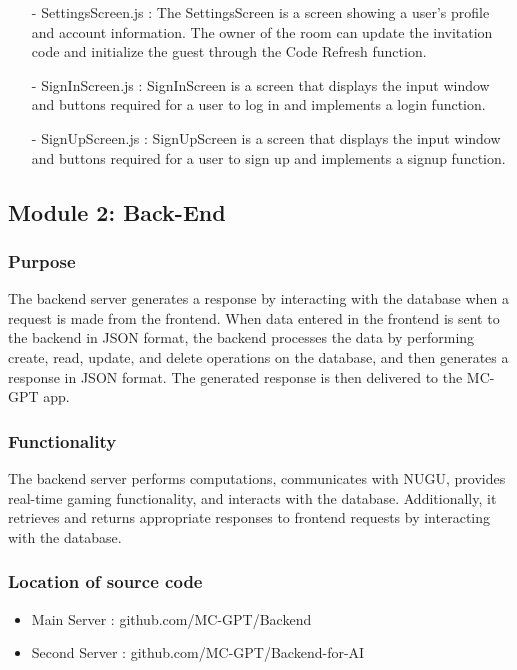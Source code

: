 \documentclass[conference]{IEEEtran}
\begin{document}
\begin{itemize}
                    \item[-] SettingsScreen.js : The SettingsScreen is a screen showing a user's profile and account information. The owner of the room can update the invitation code and initialize the guest through the Code Refresh function.
                    \item[-] SignInScreen.js : SignInScreen is a screen that displays the input window and buttons required for a user to log in and implements a login function.
                    \item[-] SignUpScreen.js : SignUpScreen is a screen that displays the input window and buttons required for a user to sign up and implements a signup function.
            \end{itemize}    
        
    \subsection{Module 2: Back-End}
        \subsubsection{Purpose} 
            The backend server generates a response by interacting with the database when a request is made from the frontend. When data entered in the frontend is sent to the backend in JSON format, the backend processes the data by performing create, read, update, and delete operations on the database, and then generates a response in JSON format. The generated response is then delivered to the MC-GPT app.\\
            \vspace{3mm}
        \subsubsection{Functionality}
            The backend server performs computations, communicates with NUGU, provides real-time gaming functionality, and interacts with the database. Additionally, it retrieves and returns appropriate responses to frontend requests by interacting with the database.\\
            \vspace{3mm}
        \subsubsection{Location of source code}
            \begin{itemize}
                \item Main Server : github.com/MC-GPT/Backend
                \item Second Server : github.com/MC-GPT/Backend-for-AI
            \end{itemize}
\end{document}
